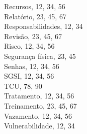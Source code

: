 \documentclass[12pt,a4paper]{report}
\begin{document}
\begin{multicols}{3}
Recursos, 12, 34, 56\\
Relatório, 23, 45, 67\\
Responsabilidades, 12, 34\\
Revisão, 23, 45, 67\\
Risco, 12, 34, 56\\
Segurança física, 23, 45\\
Senhas, 12, 34, 56\\
SGSI, 12, 34, 56\\
TCU, 78, 90\\
Tratamento, 12, 34, 56\\
Treinamento, 23, 45, 67\\
Vazamento, 12, 34, 56\\
Vulnerabilidade, 12, 34\\
\end{multicols}
\end{document}
